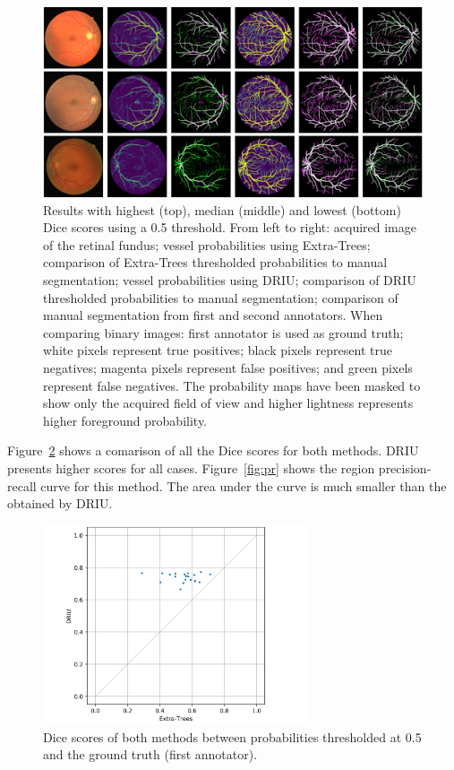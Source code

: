 \begin{figure}
  \includegraphics[width=\textwidth]{figures/collage}
  \caption{Results with highest (top), median (middle) and lowest (bottom) Dice scores using a 0.5 threshold. From left to right: acquired image of the retinal fundus; vessel probabilities using Extra-Trees; comparison of Extra-Trees thresholded probabilities to manual segmentation; vessel probabilities using DRIU; comparison of DRIU thresholded probabilities to manual segmentation; comparison of manual segmentation from first and second annotators. When comparing binary images: first annotator is used as ground truth; white pixels represent true positives; black pixels represent true negatives; magenta pixels represent false positives; and green pixels represent false negatives. The probability maps have been masked to show only the acquired field of view and higher lightness represents higher foreground probability.}
  \label{fig:collage}
\end{figure}

Figure~\ref{fig:dice} shows a comarison of all the Dice scores for both methods. DRIU presents higher scores for all cases. Figure~\ref{fig:pr} shows the region precision-recall curve for this method. The area under the curve is much smaller than the obtained by DRIU.

\begin{figure}
  \centering
  \includegraphics[width=0.7\textwidth]{figures/dices}
  \caption{Dice scores of both methods between probabilities thresholded at 0.5 and the ground truth (first annotator).}
  \label{fig:dice}
\end{figure}

